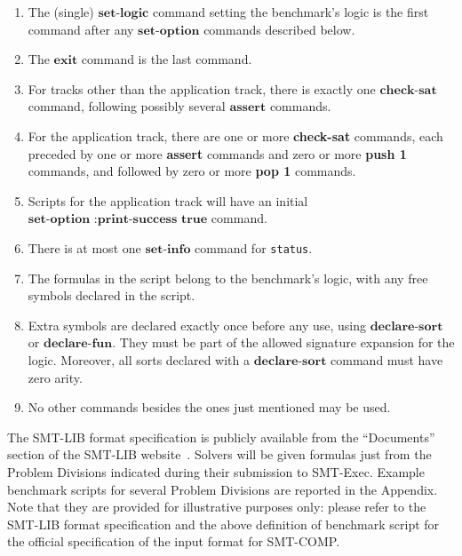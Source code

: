 \documentclass[12pt]{article}
\newcommand{\akey}[1]{\textbf{#1}}
\begin{document}
\begin{enumerate}
\item The (single) $\akey{set-logic}$ command setting the benchmark's
logic is the first command after any $\akey{set-option}$ commands described below.
\item The $\akey{exit}$ command is the last command.
\item For tracks other than the application track, there is exactly one $\akey{check-sat}$ command,
following possibly several $\akey{assert}$ commands.
\item For the application track, there are one or more \akey{check-sat} commands, 
  each preceded by one or more \akey{assert} commands 
  and zero or more \akey{push 1} commands, 
  and followed by zero or more \akey{pop 1} commands.
\item Scripts for the application track will have an initial $\akey{set-option :print-success true}$ command.
\item There is at most one $\akey{set-info}$ command for \texttt{status}.
\item The formulas in the script belong to the benchmark's logic, with
any free symbols declared in the script.
\item Extra symbols are declared exactly once before any
  use, using $\akey{declare-sort}$
  or $\akey{declare-fun}$.
  They must be part of the allowed signature expansion for the logic.
  Moreover, all sorts declared with a $\akey{declare-sort}$ command must have zero arity.


\item No other commands besides the ones just mentioned may be used.

\end{enumerate}

  
\noindent The SMT-LIB format specification is publicly
available from the ``Documents'' section of the SMT-LIB
website~\cite{SMT-LIB}.  Solvers will be given formulas just from the
Problem Divisions indicated during their submission to SMT-Exec.
Example benchmark scripts for several Problem Divisions are reported in the Appendix.
Note that they are provided for illustrative purposes only: 
please refer to the SMT-LIB format specification 
and the above definition of benchmark script for the official specification 
of the input format for SMT-COMP.
\end{document}
